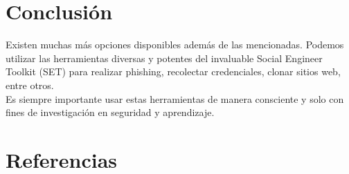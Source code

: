 \documentclass[12pt]{article}
\begin{document}
\newpage

\section{Conclusión}

\noindent
Existen muchas más opciones disponibles además de las mencionadas. Podemos utilizar las herramientas diversas y potentes del invaluable Social Engineer Toolkit (SET) para realizar phishing, recolectar credenciales, clonar sitios web, entre otros.\\
Es siempre importante usar estas herramientas de manera consciente y solo con fines de investigación en seguridad y aprendizaje.

\section{Referencias}
\end{document}
